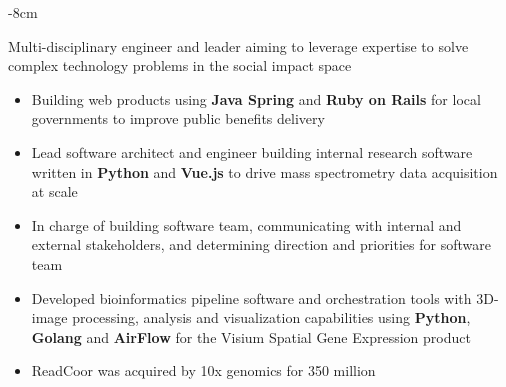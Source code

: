 \documentclass[10pt,a4paper]{altacv}
\begin{document}


\begin{adjustwidth}{}{-8cm}
\makecvheader
\end{adjustwidth}

Multi-disciplinary engineer and leader aiming to leverage expertise to solve complex technology problems in the social impact space



\begin{itemize}
    \item Building web products using \textbf{Java Spring} and  \textbf{Ruby on Rails} for local governments to improve public benefits delivery
\end{itemize}


\begin{itemize}
    \item Lead software architect and engineer building internal research software written in \textbf{Python} and \textbf{Vue.js} to drive mass spectrometry data acquisition at scale 
    \item In charge of building software team, communicating with internal and external stakeholders, and determining direction and priorities for software team
\end{itemize}

\begin{itemize}
    \item Developed bioinformatics pipeline software and orchestration tools with 3D-image processing, analysis and visualization capabilities using \textbf{Python}, \textbf{Golang} and \textbf{AirFlow} for the Visium Spatial Gene Expression product
    \item ReadCoor was acquired by 10x genomics for 350 million 
\end{itemize}
\end{document}
